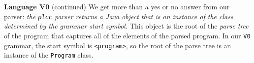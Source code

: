 \begin{minipage}[t]{\sw}
\slidenumber
\LARGE
{\bf Language V0} (continued)\exx
We get more than a yes or no answer from our parser:
{\em the \verb'plcc' parser returns a Java object
that is an instance of the class determined by the grammar start symbol.}
This object is the root of the {\em parse tree} of the program
that captures all of the elements of the parsed program.\exx
In our \verb'V0' grammar,
the start symbol is \verb'<program>',
so the root of the parse tree is an instance
of the \verb'Program' class.\exx
\end{minipage}
